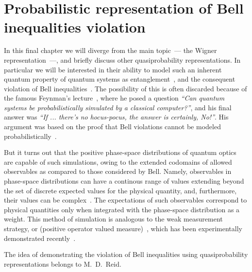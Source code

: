 \chapter{Probabilistic representation of Bell inequalities violation}
\label{cha:bell-ineq}

In this final chapter we will diverge from the main topic~--- the Wigner representation~---, and briefly discuss other quasiprobability representations.
In particular we will be interested in their ability to model such an inherent quantum property of quantum systems as entanglement~\cite{Einstein1935}, and the consequent violation of Bell inequalities~\cite{Bell1964}.
The possibility of this is often discarded because of the famous Feynman's lecture~\cite{Feynman1982}, where he posed a question \textit{``Can quantum systems be probabilistically simulated by a classical computer?''}, and his final answer was \textit{``If ... there's no hocus-pocus, the answer is certainly, No!''}.
His argument was based on the proof that Bell violations cannot be modeled probabilistically~\cite{Bell1964}.

But it turns out that the positive phase-space distributions of quantum optics~\cite{Husimi1940,Drummond1980,Hillery1984,Gardiner2004} are capable of such simulations, owing to the extended codomains of allowed observables as compared to those considered by Bell.
Namely, observables in phase-space distributions can have a continous range of values extending beyond the set of discrete expected values for the physical quantity, and, furthermore, their values can be complex~\cite{Reid1986}.
The expectations of such observables correspond to physical quantities only when integrated with the phase-space distribution as a weight.
This method of simulation is analogous to the weak measurement strategy, or  (positive operator valued measure)~\cite{Aharonov1988}, which has been experimentally demonstrated recently~\cite{Goggin2011}.

The idea of demonstrating the violation of Bell inequalities using quasiprobability representations belongs to M.~D.~Reid.





